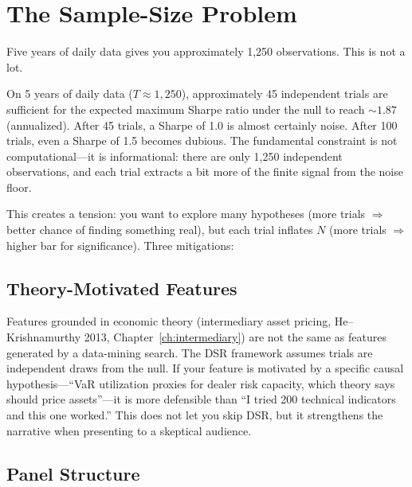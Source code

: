 \section{The Sample-Size Problem}
\label{sec:sample-size}

Five years of daily data gives you approximately 1{,}250 observations. This is not a lot.

\begin{keyresult}
On 5 years of daily data ($T \approx 1{,}250$), approximately 45 independent trials are sufficient for the expected maximum Sharpe ratio under the null to reach ${\sim}1.87$ (annualized). After 45 trials, a Sharpe of 1.0 is almost certainly noise. After 100 trials, even a Sharpe of 1.5 becomes dubious. The fundamental constraint is not computational---it is informational: there are only 1{,}250 independent observations, and each trial extracts a bit more of the finite signal from the noise floor.
\end{keyresult}

This creates a tension: you want to explore many hypotheses (more trials $\Rightarrow$ better chance of finding something real), but each trial inflates $N$ (more trials $\Rightarrow$ higher bar for significance). Three mitigations:

\subsection{Theory-Motivated Features}

Features grounded in economic theory (intermediary asset pricing, He--Krishnamurthy 2013, Chapter~\ref{ch:intermediary}) are not the same as features generated by a data-mining search. The DSR framework assumes trials are independent draws from the null. If your feature is motivated by a specific causal hypothesis---``VaR utilization proxies for dealer risk capacity, which theory says should price assets''---it is more defensible than ``I tried 200 technical indicators and this one worked.'' This does not let you skip DSR, but it strengthens the narrative when presenting to a skeptical audience.

\subsection{Panel Structure}

